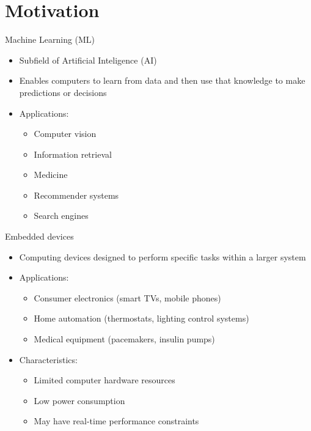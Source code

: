 
\section{Motivation}

\begin{frame}{Machine Learning (ML)}
\begin{itemize}
  \item Subfield of Artificial Inteligence (AI)
  \item Enables computers to learn from data and then use that knowledge to
  make predictions or decisions
  \item Applications:
	\begin{itemize}
	  \item Computer vision
	  \item Information retrieval
	  \item Medicine
	  \item Recommender systems
	  \item Search engines
	\end{itemize}
\end{itemize}
\end{frame}

\begin{frame}{Embedded devices}
\begin{itemize}
  \item Computing devices designed to perform specific tasks within a larger system
 \item Applications:
	\begin{itemize}
	  \item Consumer electronics (smart TVs, mobile phones)
	  \item Home automation (thermostats, lighting control systems)
	  \item Medical equipment (pacemakers, insulin pumps)
	\end{itemize}
  \item Characteristics:
	\begin{itemize}
	  \item Limited computer hardware resources
	  \item Low power consumption
	  \item May have real-time performance constraints
	\end{itemize}
\end{itemize}
\end{frame}

